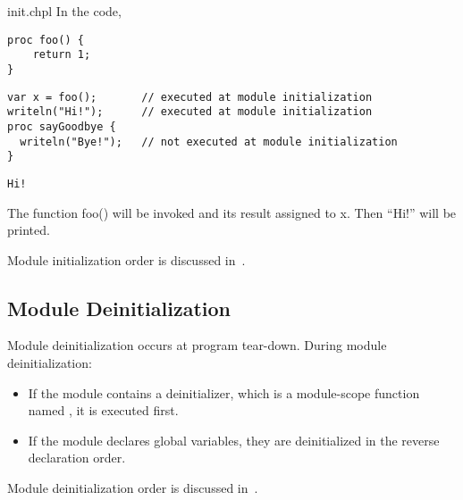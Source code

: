 \begin{chapelexample}{init.chpl}
In the code,
\begin{chapelpre}
\begin{verbatim}
proc foo() {
    return 1;
}
\end{verbatim}
\end{chapelpre}
\begin{chapel}
\begin{verbatim}
var x = foo();       // executed at module initialization
writeln("Hi!");      // executed at module initialization
proc sayGoodbye {
  writeln("Bye!");   // not executed at module initialization
}
\end{verbatim}
\end{chapel}
\begin{chapeloutput}
\begin{verbatim}
Hi!
\end{verbatim}
\end{chapeloutput}
The function foo() will be invoked and its result assigned to x.  Then
``Hi!'' will be printed.
\end{chapelexample}

Module initialization order is discussed
in~.


\subsection{Module Deinitialization}
\label{Module_Deinitialization}

Module deinitialization occurs at program tear-down.
During module deinitialization:

\begin{itemize}

\item If the module contains a deinitializer, which is a module-scope function
named , it is executed first.

\item If the module declares global variables, they are deinitialized
in the reverse declaration order.

\end{itemize}


Module deinitialization order is discussed
in~.


